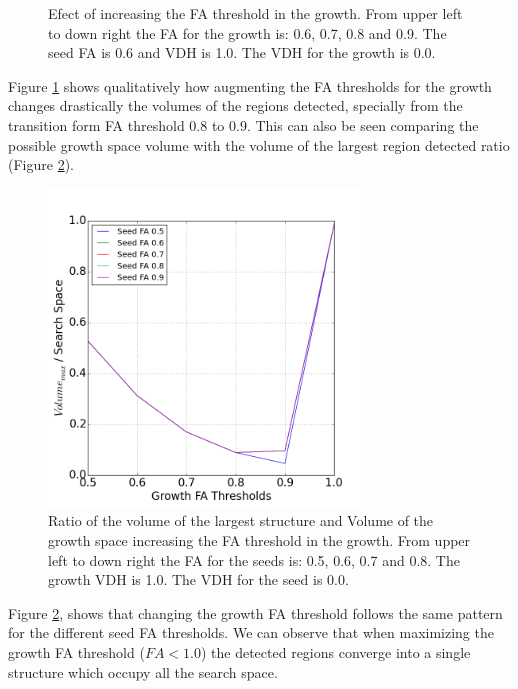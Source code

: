 \documentclass[12pt]{article}
\begin{document}
\begin{figure}[ht]
\begin{minipage}{.45\textwidth}
\end{minipage}
\caption{Efect of increasing the FA threshold in the growth. From upper left to down right the FA for the growth is: 0.6, 0.7, 0.8 and 0.9. The seed FA is 0.6 and VDH is 1.0. The VDH for the growth is 0.0.} \label{fg:3D_FA_growth}
\end{figure}
\FloatBarrier

\begin{par}
 Figure \ref{fg:3D_FA_growth} shows qualitatively how augmenting the FA thresholds for the growth changes drastically the volumes of the regions detected, specially from the transition form FA threshold 0.8 to 0.9. This can also be seen comparing the possible growth space volume with the volume of the largest region detected ratio (Figure \ref{fg:vol_FA_growth}).
\end{par}

\begin{figure}[ht]
\centering
  \includegraphics[width=0.75\textwidth]{groups/volumeplots/volumes_growth_FA_All_WITH_ZERO.png}
\caption{Ratio of the volume of the largest structure and Volume of the growth space  increasing the FA threshold in the growth. From upper left to down right the FA for the seeds is: 0.5, 0.6, 0.7 and 0.8. The growth VDH is 1.0. The VDH for the seed is 0.0.} \label{fg:vol_FA_growth}
\end{figure}
\FloatBarrier

\begin{par}
Figure \ref{fg:vol_FA_growth}, shows that changing the
 growth FA threshold follows the
  same pattern for the different seed FA
   thresholds. We can observe that when maximizing the
    growth FA threshold ($FA < 1.0$) the detected regions
     converge into a single structure which occupy all
      the search space.
\end{par}
\end{document}
